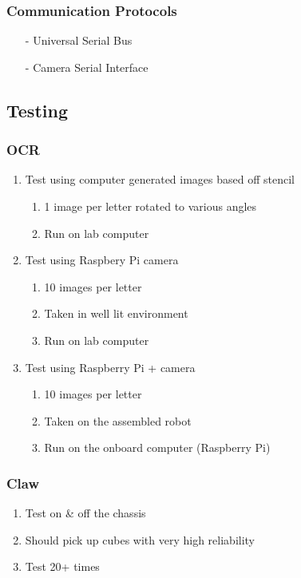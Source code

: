 \documentclass[12pt]{article}
\begin{document}
\subsubsection{Communication Protocols}

\begin{itemize}[noitemsep]
	\item[-] Universal Serial Bus
	\item[-] Camera Serial Interface
\end{itemize}

\subsection{Testing}
\subsubsection{OCR}
	\begin{enumerate}[noitemsep]
		\item Test using computer generated images based off stencil
		\begin{enumerate}[noitemsep]
			\item 1 image per letter rotated to various angles
			\item Run on lab computer
		\end{enumerate}
		\item Test using Raspbery Pi camera
		\begin{enumerate}[noitemsep]
			\item 10 images per letter
			\item Taken in well lit environment
			\item Run on lab computer
		\end{enumerate}
		\item Test using Raspberry Pi + camera
		\begin{enumerate}[noitemsep]
			\item 10 images per letter
			\item Taken on the assembled robot
			\item Run on the onboard computer (Raspberry Pi)
		\end{enumerate}
	\end{enumerate}
\subsubsection{Claw}
	\begin{enumerate}[noitemsep]
		\item Test on \& off the chassis
		\item Should pick up cubes with very high reliability
		\item Test 20+ times
	\end{enumerate}
\end{document}
